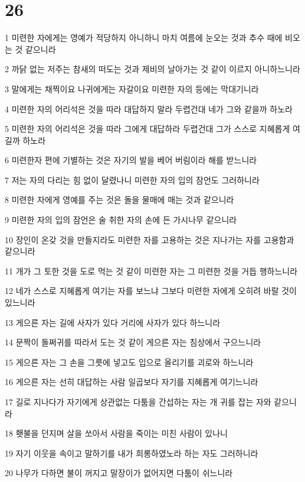 \chapter{26}

\par 1 미련한 자에게는 영예가 적당하지 아니하니 마치 여름에 눈오는 것과 추수 때에 비오는 것 같으니라
\par 2 까닭 없는 저주는 참새의 떠도는 것과 제비의 날아가는 것 같이 이르지 아니하느니라
\par 3 말에게는 채찍이요 나귀에게는 자갈이요 미련한 자의 등에는 막대기니라
\par 4 미련한 자의 어리석은 것을 따라 대답하지 말라 두렵건대 네가 그와 같을까 하노라
\par 5 미련한 자의 어리석은 것을 따라 그에게 대답하라 두렵건대 그가 스스로 지혜롭게 여길까 하노라
\par 6 미련한자 편에 기별하는 것은 자기의 발을 베어 버림이라 해를 받느니라
\par 7 저는 자의 다리는 힘 없이 달렸나니 미련한 자의 입의 잠언도 그러하니라
\par 8 미련한 자에게 영예를 주는 것은 돌을 물매에 매는 것과 같으니라
\par 9 미련한 자의 입의 잠언은 술 취한 자의 손에 든 가시나무 같으니라
\par 10 장인이 온갖 것을 만들지라도 미련한 자를 고용하는 것은 지나가는 자를 고용함과 같으니라
\par 11 개가 그 토한 것을 도로 먹는 것 같이 미련한 자는 그 미련한 것을 거듭 행하느니라
\par 12 네가 스스로 지혜롭게 여기는 자를 보느냐 그보다 미련한 자에게 오히려 바랄 것이 있느니라
\par 13 게으른 자는 길에 사자가 있다 거리에 사자가 있다 하느니라
\par 14 문짝이 돌쩌귀를 따라서 도는 것 같이 게으른 자는 침상에서 구으느니라
\par 15 게으른 자는 그 손을 그릇에 넣고도 입으로 올리기를 괴로와 하느니라
\par 16 게으른 자는 선히 대답하는 사람 일곱보다 자기를 지혜롭게 여기느니라
\par 17 길로 지나다가 자기에게 상관없는 다툼을 간섭하는 자는 개 귀를 잡는 자와 같으니라
\par 18 횃불을 던지며 살을 쏘아서 사람을 죽이는 미친 사람이 있나니
\par 19 자기 이웃을 속이고 말하기를 내가 희롱하였노라 하는 자도 그러하니라
\par 20 나무가 다하면 불이 꺼지고 말장이가 없어지면 다툼이 쉬느니라
